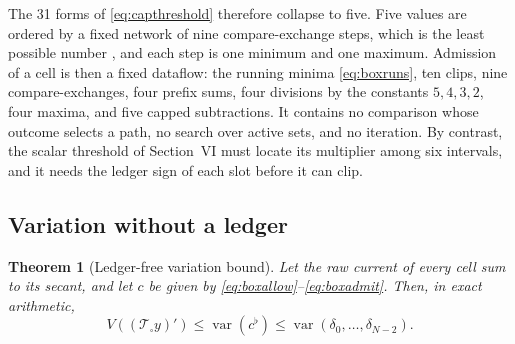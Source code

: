 \documentclass[journal]{IEEEtran}
\newtheorem{theorem}{Theorem}
\newcommand{\Tcal}{\mathcal{T}}
\newcommand{\var}{\operatorname{var}}
\begin{document}
The 31 forms of \eqref{eq:capthreshold} therefore collapse to five. Five
values are ordered by a fixed network of nine compare-exchange steps,
which is the least possible number \cite{knuth1998}, and each step is one
minimum and one maximum. Admission of a cell is then a fixed dataflow:
the running minima \eqref{eq:boxruns}, ten clips, nine compare-exchanges,
four prefix sums, four divisions by the constants \(5,4,3,2\), four
maxima, and five capped subtractions. It contains no comparison whose
outcome selects a path, no search over active sets, and no iteration. By
contrast, the scalar threshold of Section~VI must locate its multiplier
among six intervals, and it needs the ledger sign of each slot before it
can clip.

\subsection{Variation without a ledger}

\begin{theorem}[Ledger-free variation bound]
\label{thm:boxvariation}
Let the raw current of every cell sum to its secant, and let \(c\) be
given by \eqref{eq:boxallow}--\eqref{eq:boxadmit}. Then, in exact
arithmetic,
\begin{equation}
 V((\Tcal_\square y)')\le\var(c^\flat)\le
 \var(\delta_0,\ldots,\delta_{N-2}).
 \label{eq:boxvardim}
\end{equation}
\end{theorem}
\end{document}
